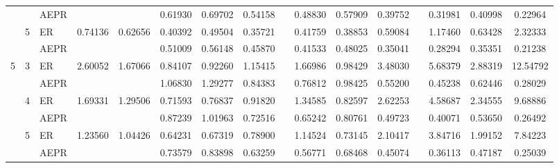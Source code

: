 \documentclass[twoside]{article}
\begin{document}
\begin{table}
{\begin{tabular}{cclccccccccccccc}
            &   &  AEPR  & &                            &   0.61930   &  0.69702   &  0.54158   &&  0.48830  &   0.57909  &   0.39752  &&   0.31981  &   0.40998  &   0.22964\\
            & 5 & ER    &  0.74136 & 0.62656  &   0.40392  &   0.49504  &   0.35721 &&    0.41759  &   0.38853    & 0.59084   &&  1.17460 &    0.63428 &    2.32333\\
\vspace{2mm}
            &   &  AEPR  & &                           &   0.51009   &  0.56148   &  0.45870   &&  0.41533  &    0.48025  &   0.35041 &&    0.28294 &    0.35351  &   0.21238\\ 
5          & 3 & ER    & 2.60052 & 1.67066  &   0.84107   &  0.92260   &  1.15415   &&  1.66986   &    0.98429   &   3.48030   &&  5.68379  &   2.88319  &  12.54792\\
            &   &  AEPR  & &                            &   1.06830  &   1.29277   &  0.84383    && 0.76812   &  0.98425    &  0.55200   &&  0.45238   &  0.62446  &   0.28029\\
            & 4 & ER    & 1.69331 & 1.29506   &  0.71593   &  0.76837   &  0.91820   &&  1.34585    & 0.82597    & 2.62253   &&  4.58687  &   2.34555  &   9.68886\\
            &   &  AEPR  & &                          &   0.87239   &  1.01963    & 0.72516   &&  0.65242   &  0.80761   &  0.49723    && 0.40071   &  0.53650   &  0.26492\\
            & 5 & ER    & 1.23560  & 1.04426  &   0.64231   &  0.67319  &   0.78900   &&  1.14524  &   0.73145 &    2.10417   &&  3.84716  &   1.99152  &   7.84223\\
            &   &  AEPR  & &                          &    0.73579 &    0.83898  &   0.63259  &&   0.56771  &   0.68468   &  0.45074 &&    0.36113  &   0.47187 &    0.25039\\
\hline
\end{tabular}\label{t1}}
\end{table}



\end{document}
